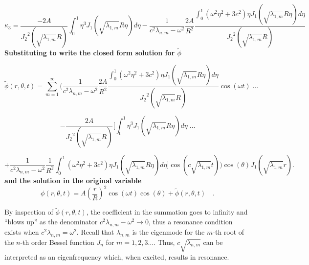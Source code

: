 \documentclass{homework}
\begin{document}
\[ \kappa_3 = \frac{-2A}{{J_2}^2 \left( \sqrt{\lambda_{1,m}} R \right)} \int_0^1 \eta^3 J_1 \left( \sqrt{\lambda_{1,m}} R \eta \right) d \eta - \frac{1}{c^2 \lambda_{n,m} - \omega^2} \frac{2A}{R^2} \frac{\int_0^1 \left( \omega^2 \eta^2 + 3c^2 \right) \eta J_1\left( \sqrt{\lambda_{1,m}} R \eta \right) d\eta }{{J_2}^2 \left( \sqrt{\lambda_{1,m}} R \right)}\]
\noindent
\textbf{Substituting to write the closed form solution for $\tilde{\phi}$}

$$ \tilde{\phi} (r, \theta, t) = \sum_{m=1}^\infty \Biggl( \frac{1}{c^2 \lambda_{n,m} - \omega^2} \frac{2A}{R^2} \frac{\int_0^1 \left( \omega^2 \eta^2 + 3c^2 \right) \eta J_1\left( \sqrt{\lambda_{1,m}} R \eta \right) d\eta }{{J_2}^2 \left( \sqrt{\lambda_{1,m}} R \right)} \cos(\omega t) \; \dots $$

$$ - \frac{2A}{{J_2}^2 \left( \sqrt{\lambda_{1,m}} R \right)}\Bigg[ \int_0^1 \eta^3 J_1 \left( \sqrt{\lambda_{1,m}} R\eta \right) d\eta \; \dots $$

$$ + \frac{1}{c^2 \lambda_{n,m} - \omega^2} \frac{1}{R^2} \int_0^1 \left(\omega^2 \eta^2 + 3c^2 \right) \eta J_1 \left(\sqrt{\lambda_{1,m}} R \eta \right) d\eta \Bigg] \cos \left(c \sqrt{\lambda_{1,m}} t \right) \Biggl) \cos(\theta) J_1 \left(\sqrt{\lambda_{1,m} } r \right) .$$
\noindent
\textbf{and the solution in the original variable}
$$ \phi(r, \theta, t) = A \left(\frac{r}{R} \right)^2 \cos(\omega t) \cos(\theta) + \tilde{\phi} (r, \theta, t) \quad .$$ 

\noindent By inspection of $\tilde{\phi}(r, \theta, t)$, the coefficient in the summation goes to infinity and ``blows up'' as the denominator $c^2 \lambda_{n,m} - \omega^2 \rightarrow 0$, thus a resonance condition exists when $c^2 \lambda_{n,m} = \omega^2$. Recall that $\lambda_{n,m}$ is the eigenmode for the $m$-th root of the $n$-th order Bessel function $J_n$ for $m = 1,2,3 \dots$. Thus, $c \sqrt{\lambda_{n,m}}$ can be interpreted as an eigenfrequency which, when excited, results in resonance. 

\end{document}
